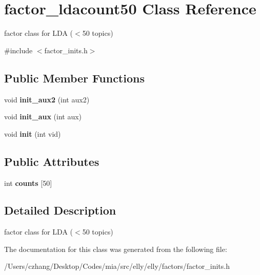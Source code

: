 \hypertarget{classfactor__ldacount50}{\section{factor\-\_\-ldacount50 Class Reference}
\label{classfactor__ldacount50}
}


factor class for L\-D\-A ($<$50 topics)  




{\ttfamily \#include $<$factor\-\_\-inits.\-h$>$}

\subsection*{Public Member Functions}
\begin{DoxyCompactItemize}
\item 
\hypertarget{classfactor__ldacount50_a852c648d68d6067e18bfece3af25f30c}{void {\bfseries init\-\_\-aux2} (int aux2)}\label{classfactor__ldacount50_a852c648d68d6067e18bfece3af25f30c}

\item 
\hypertarget{classfactor__ldacount50_a8d028cf2625f639fd07997a9461e231d}{void {\bfseries init\-\_\-aux} (int aux)}\label{classfactor__ldacount50_a8d028cf2625f639fd07997a9461e231d}

\item 
\hypertarget{classfactor__ldacount50_aa53bf93ed30196edaa617624495c509d}{void {\bfseries init} (int vid)}\label{classfactor__ldacount50_aa53bf93ed30196edaa617624495c509d}

\end{DoxyCompactItemize}
\subsection*{Public Attributes}
\begin{DoxyCompactItemize}
\item 
\hypertarget{classfactor__ldacount50_aace3b3d0a4697ebb3baf4479fb5840f8}{int {\bfseries counts} \mbox{[}50\mbox{]}}\label{classfactor__ldacount50_aace3b3d0a4697ebb3baf4479fb5840f8}

\end{DoxyCompactItemize}


\subsection{Detailed Description}
factor class for L\-D\-A ($<$50 topics) 

The documentation for this class was generated from the following file\-:\begin{DoxyCompactItemize}
\item 
/\-Users/czhang/\-Desktop/\-Codes/mia/src/elly/elly/factors/factor\-\_\-inits.\-h\end{DoxyCompactItemize}
